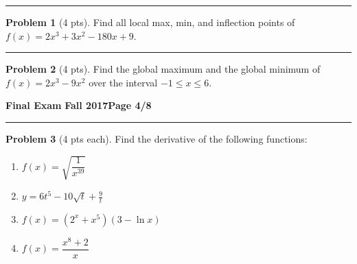 \documentclass[12pt]{article}
\theoremstyle{definition}
\newtheorem{problem}{Problem}
\begin{document}
\hrule
\begin{problem}[4 pts]
Find all local max, min, and inflection points of $f(x) = 2x^3 + 3x^2-180x+9$.
\end{problem}
\vspace{6cm}
\hrule
\begin{problem}[4 pts]
Find the global maximum and the global minimum of $f(x) = 2x^3 - 9x^2$ over the interval $-1 \leq x \leq 6$.
\end{problem}

\newpage

\hfill{\large\bf Final Exam}\hfill{\large\bf
  Fall 2017}\hfill{\large\bf Page 4/8}\hrule

\bigskip

\bigskip
\begin{problem}[4 pts each]
Find the derivative of the following functions:
\begin{enumerate}
\item $f(x) = \sqrt{\dfrac{1}{x^{39}}}$
\begin{flushright}
\end{flushright}
\item $y = 6t^5 - 10\sqrt{t} + \frac{9}{t}$
\begin{flushright}
\end{flushright}
\item $f(x) = (2^x + x^5)(3 - \ln x)$
\begin{flushright}
\end{flushright}
\item $f(x) = \dfrac{x^8+2}{x}$
\begin{flushright}
\end{flushright}

\end{enumerate}
\end{problem}
\end{document}
